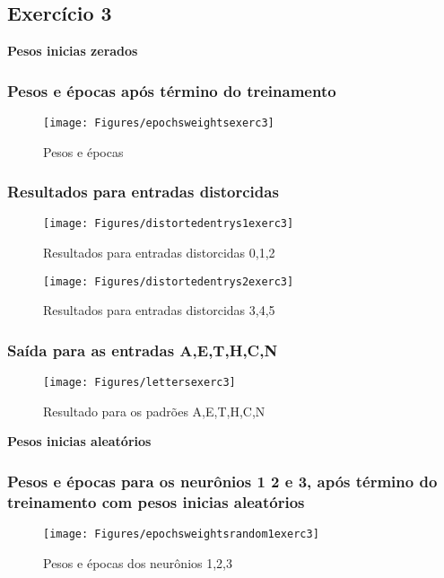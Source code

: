 \documentclass[hidelinks,12pt]{article}
\begin{document}
\subsection{Exercício 3}
	\large {\textbf{Pesos inicias zerados}}
	
	\newpage
	\subsubsection{Pesos e épocas após término do treinamento}
		\begin{figure}[h!]
			\centering
			\texttt{[image: Figures/epochsweightsexerc3]}
			\caption{Pesos e épocas}
		\end{figure}
		
	\newpage
	\subsubsection{Resultados para entradas distorcidas}

		\begin{figure}[h!]
			\centering
			\texttt{[image: Figures/distortedentrys1exerc3]}
			\caption{Resultados para entradas distorcidas 0,1,2}
		\end{figure}
	
		\begin{figure}[h!]
			\centering
			\texttt{[image: Figures/distortedentrys2exerc3]}
			\caption{Resultados para entradas distorcidas 3,4,5}
		\end{figure}
	\newpage
	\subsubsection{Saída para as entradas A,E,T,H,C,N}

		\begin{figure}[h!]
			\centering
			\texttt{[image: Figures/lettersexerc3]}
			\caption{Resultado para os padrões A,E,T,H,C,N}
		\end{figure}
	
	
	\newpage
	{\textbf{\large Pesos inicias aleatórios}}
	
	
	\subsubsection{Pesos e épocas para os neurônios 1 2 e 3, após término do treinamento com pesos inicias aleatórios}

		\begin{figure}[h!]
			\centering
			\texttt{[image: Figures/epochsweightsrandom1exerc3]}
			\caption{Pesos e épocas dos neurônios 1,2,3}
		\end{figure}
	
\end{document}
